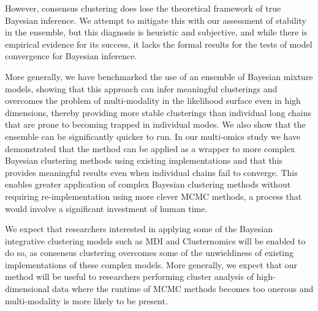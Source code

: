\documentclass{bmcart}
\begin{document}
However, consensus clustering does lose the theoretical framework of true Bayesian inference. We attempt to mitigate this with our assessment of stability in the ensemble, but this diagnosis is heuristic and subjective, and while there is empirical evidence for its success, it lacks the formal results for the tests of model convergence for Bayesian inference.

More generally, we have benchmarked the use of an ensemble of Bayesian mixture models, showing that this approach can infer meaningful clusterings and overcomes the problem of multi-modality in the likelihood surface even in high dimensions, thereby providing more stable clusterings than individual long chains that are prone to becoming trapped in individual modes. We also show that the ensemble can be significantly quicker to run. In our multi-omics study we have demonstrated that the method can be applied as a wrapper to more complex Bayesian clustering methods using existing implementations and that this provides meaningful results even when individual chains fail to converge. This enables greater application of complex Bayesian clustering methods without requiring re-implementation using more clever MCMC methods, a process that would involve a significant investment of human time.



We expect that researchers interested in applying some of the Bayesian integrative clustering models such as MDI and Clusternomics \citep{gabasova2017clusternomics} will be enabled to do so, as consensus clustering overcomes some of the unwieldiness of existing implementations of these complex models. More generally, we expect that our method will be useful to researchers performing cluster analysis of high-dimensional data where the runtime of MCMC methods becomes too onerous and multi-modality is more likely to be present.

\end{document}
